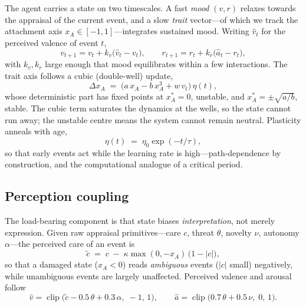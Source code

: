 \documentclass[11pt]{article}
\newcommand{\xa}{x_{A}}
\newcommand{\clip}{\operatorname{clip}}
\begin{document}
The agent carries a state on two timescales. A fast \emph{mood} $(v, r)$ relaxes
towards the appraisal of the current event, and a slow \emph{trait} vector---of which
we track the attachment axis $\xa \in [-1, 1]$---integrates sustained mood. Writing
$\hat{v}_t$ for the perceived valence of event $t$,
\begin{equation}
v_{t+1} = v_t + k_v\bigl(\hat{v}_t - v_t\bigr),
\qquad
r_{t+1} = r_t + k_r\bigl(\hat{a}_t - r_t\bigr),
\label{eq:mood}
\end{equation}
with $k_v, k_r$ large enough that mood equilibrates within a few interactions. The
trait axis follows a cubic (double-well) update,
\begin{equation}
\Delta \xa \;=\; \bigl(a\,\xa - b\,\xa^{3} + w\,v_t\bigr)\,\eta(t),
\label{eq:well}
\end{equation}
whose deterministic part has fixed points at $\xa^{*} = 0$, unstable, and
$\xa^{*} = \pm\sqrt{a/b}$, stable. The cubic term saturates the dynamics at the wells,
so the state cannot run away; the unstable centre means the system cannot remain
neutral. Plasticity anneals with age,
\begin{equation}
\eta(t) \;=\; \eta_0 \exp(-t/\tau),
\label{eq:anneal}
\end{equation}
so that early events act while the learning rate is high---path-dependence by
construction, and the computational analogue of a critical period.

\subsection{Perception coupling}

The load-bearing component is that state biases \emph{interpretation}, not merely
expression. Given raw appraisal primitives---care $c$, threat $\theta$, novelty $\nu$,
autonomy $\alpha$---the perceived care of an event is
\begin{equation}
\tilde{c} \;=\; c \;-\; \kappa \max(0, -\xa)\,\bigl(1 - |c|\bigr),
\label{eq:bias}
\end{equation}
so that a damaged state ($\xa < 0$) reads \emph{ambiguous} events ($|c|$ small)
negatively, while unambiguous events are largely unaffected. Perceived valence and
arousal follow
\begin{equation}
\hat{v} = \clip\bigl(\tilde{c} - 0.5\,\theta + 0.3\,\alpha,\; -1,\, 1\bigr),
\qquad
\hat{a} = \clip\bigl(0.7\,\theta + 0.5\,\nu,\; 0,\, 1\bigr).
\label{eq:adapter}
\end{equation}
\end{document}
